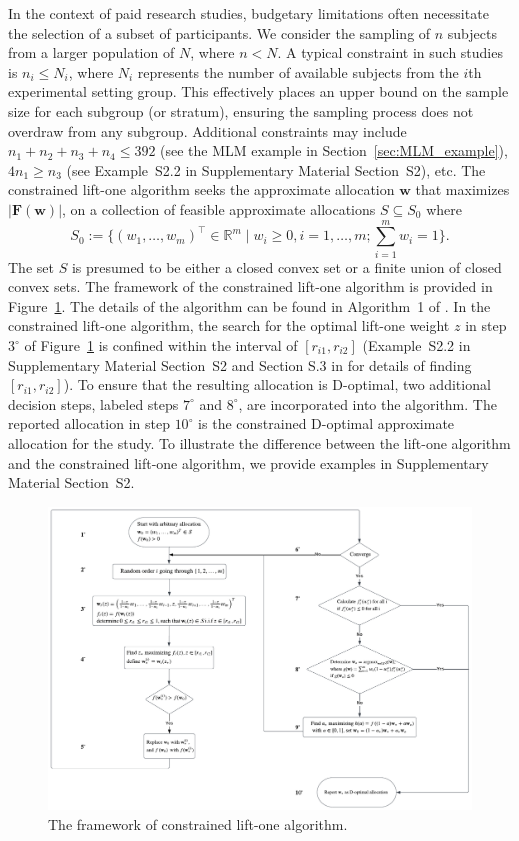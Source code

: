 In the context of paid research studies, budgetary limitations often necessitate the selection of a subset of participants. We consider the sampling of $n$ subjects from a larger population of $N$, where $n < N$. A typical constraint in such studies is $n_i \leq N_i$, where $N_i$ represents the number of available subjects from the $i$th experimental setting group. This effectively places an upper bound on the sample size for each subgroup (or stratum), ensuring the sampling process does not overdraw from any subgroup. Additional constraints may include $n_1 + n_2 + n_3 + n_4 \leq 392$ (see the MLM example in Section~\ref{sec:MLM_example}), $4n_1 \geq n_3$ (see Example~S2.2 in Supplementary Material Section~S2), etc. The constrained lift-one algorithm seeks the approximate allocation ${\mathbf w}$ that maximizes $|{\mathbf F}({\mathbf w})|$, on a collection of feasible approximate allocations $S \subseteq S_0$ where $$S_0 := \{(w_1, \ldots, w_m)^\top \in \mathbb{R}^m \mid w_i \geq 0, i=1, \ldots, m; \sum_{i=1}^m w_i = 1\}.$$ The set $S$ is presumed to be either a closed convex set or a finite union of closed convex sets.  The framework of the constrained lift-one algorithm is provided in Figure~\ref{fig:constrained_liftone_algo}. The details of the algorithm can be found in Algorithm~1 of \citet{huang2023constrained}. In the constrained lift-one algorithm, the search for the optimal lift-one weight $z$ in step $3^\circ$ of Figure~\ref{fig:constrained_liftone_algo} is confined within the interval of $[r_{i1}, r_{i2}]$ (Example~S2.2 in Supplementary Material Section~S2 and Section S.3 in \cite{huang2023constrained} for details of finding $[r_{i1}, r_{i2}]$).   To ensure that the resulting allocation is D-optimal, two additional decision steps, labeled steps $7^\circ$ and $8^\circ$, are incorporated into the algorithm. The reported allocation in step $10^\circ$ is the constrained D-optimal approximate allocation for the study. To illustrate the difference between the lift-one algorithm and the constrained lift-one algorithm, we provide examples in Supplementary Material Section~S2.

\begin{figure}[htb!]
  \centering
  \includegraphics[width=\textwidth]{figures/Lift_one.png}
  \caption{The framework of constrained lift-one algorithm.}
  \label{fig:constrained_liftone_algo}
\end{figure}

